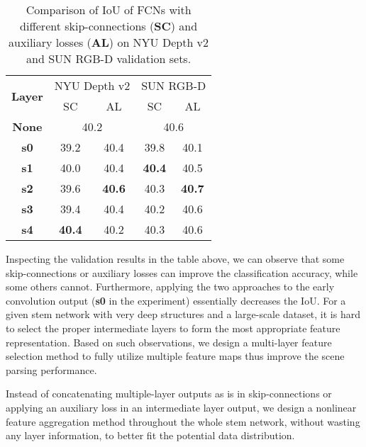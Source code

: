 \documentclass[10pt,twocolumn,twoside]{IEEEtran}
\begin{document}
\begin{table}[h]
\centering 
\caption{Comparison of IoU of FCNs with different skip-connections ({\bf SC}) and auxiliary losses ({\bf AL}) on NYU Depth v2 and SUN RGB-D validation sets.}
\label{TB:SKIP}
\begin{tabular}{|c||c|c|c|c|}
\hline
\multirow{2}{*}{{\bf Layer}} & \multicolumn{2}{c|}{NYU Depth v2} & \multicolumn{2}{c|}{SUN RGB-D}	 \\
\cline{2-5}  & SC &AL  & SC &AL  \\
\hline

{\bf None}     & \multicolumn{2}{c|}{40.2} & \multicolumn{2}{c|}{40.6} \\
\cline{2-5}
{\bf s0}	     & 39.2 & 40.4   & 39.8 & 40.1 \\
{\bf s1}	      & 40.0 & 40.4  & {\bf 40.4} & 40.5 \\
{\bf s2}	      & 39.6 & {\bf 40.6}   & 40.3 & {\bf 40.7} \\
{\bf s3}	       & 39.4 & 40.4 & 40.2  & 40.6 \\
{\bf s4}	       & {\bf 40.4} & 40.2 & 40.3  & 40.6 \\
\hline
\end{tabular}
\end{table}

Inspecting the validation results in the table above, we can observe that some skip-connections or auxiliary losses can improve the classification accuracy, while some others cannot. Furthermore, applying the two approaches to the early convolution output ({\bf s0} in the experiment) essentially decreases the IoU. For a given stem network with very deep structures and a large-scale dataset, it is hard to select the proper intermediate layers to form the most appropriate feature representation. Based on such observations, we design a multi-layer feature selection method to fully utilize multiple feature maps thus improve the scene parsing performance.  

Instead of concatenating multiple-layer outputs as is in skip-connections or applying an auxiliary loss in an intermediate layer output, we design a nonlinear feature aggregation method throughout the whole stem network, without wasting any layer information, to better fit the potential data distribution.
\end{document}
